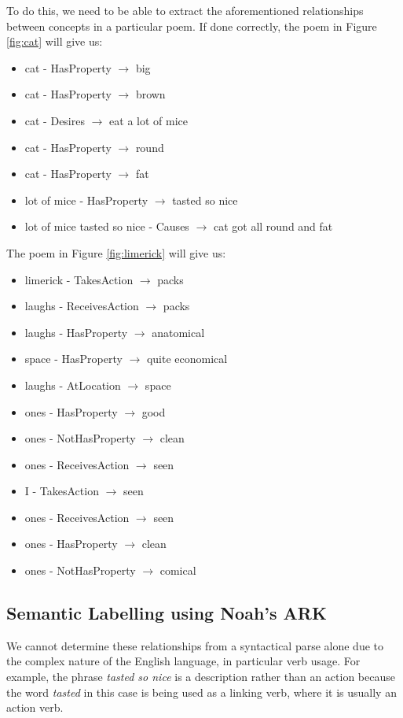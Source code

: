To do this, we need to be able to extract the aforementioned relationships between concepts in a particular poem. If done correctly, the poem in Figure \ref{fig:cat} will give us: 
\begin{itemize}
\item{cat - HasProperty $\rightarrow$ big}
\item{cat - HasProperty $\rightarrow$ brown}
\item{cat - Desires $\rightarrow$ eat a lot of mice}
\item{cat - HasProperty $\rightarrow$ round}
\item{cat - HasProperty $\rightarrow$ fat}
\item{lot of mice - HasProperty $\rightarrow$ tasted so nice}
\item{lot of mice tasted so nice - Causes $\rightarrow$ cat got all round and fat}
\end{itemize}

The poem in Figure \ref{fig:limerick} will give us:
\begin{itemize}
\item{limerick - TakesAction $\rightarrow$ packs}
\item{laughs - ReceivesAction $\rightarrow$ packs}
\item{laughs - HasProperty $\rightarrow$ anatomical}
\item{space - HasProperty $\rightarrow$ quite economical}
\item{laughs - AtLocation $\rightarrow$ space}
\item{ones - HasProperty $\rightarrow$ good}
\item{ones - NotHasProperty $\rightarrow$ clean}
\item{ones - ReceivesAction $\rightarrow$ seen}
\item{I - TakesAction $\rightarrow$ seen}
\item{ones - ReceivesAction $\rightarrow$ seen}
\item{ones - HasProperty $\rightarrow$ clean}
\item{ones - NotHasProperty $\rightarrow$ comical}
\end{itemize}


\subsection{Semantic Labelling using Noah's ARK}

We cannot determine these relationships from a syntactical parse alone due to the complex nature of the English language, in particular verb usage. For example, the phrase \textit{tasted so nice} is a description rather than an action because the word \textit{tasted} in this case is being used as a linking verb, where it is usually an action verb.

